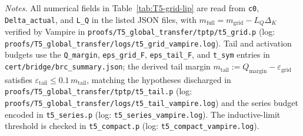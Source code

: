 \noindent\emph{Notes.} All numerical fields in Table~\ref{tab:T5-grid-lip} are read from \texttt{c0}, \texttt{Delta\_actual}, and \texttt{L\_Q} in the listed JSON files, with $m_{\mathrm{full}}=m_{\mathrm{grid}}-L_Q\Delta_K$ verified by Vampire in \texttt{proofs/T5\_global\_transfer/tptp/t5\_grid.p} (log: \texttt{proofs/T5\_global\_transfer/logs/t5\_grid\_vampire.log}). Tail and activation budgets use the \texttt{Q\_margin}, \texttt{eps\_grid\_F}, \texttt{eps\_tail\_F}, and \texttt{t\_sym} entries in \texttt{cert/bridge/brc\_summary.json}; the derived tail margin $m_{\mathrm{tail}}:=Q_{\mathrm{margin}}-\varepsilon_{\mathrm{grid}}$ satisfies $\varepsilon_{\mathrm{tail}}\le 0.1\,m_{\mathrm{tail}}$, matching the hypotheses discharged in \texttt{proofs/T5\_global\_transfer/tptp/t5\_tail.p} (log: \texttt{proofs/T5\_global\_transfer/logs/t5\_tail\_vampire.log}) and the series budget encoded in \texttt{t5\_series.p} (log: \texttt{t5\_series\_vampire.log}). The inductive-limit threshold is checked in \texttt{t5\_compact.p} (log: \texttt{t5\_compact\_vampire.log}).
